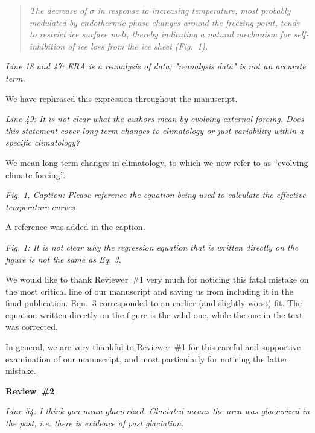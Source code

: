 \documentclass[10pt]{article}
\def\referee#1{\bigskip\textcolor{blue!50!black}{\textit{#1}}}
\def\msquote#1{\begin{quote}\textit{#1}\end{quote}}
\begin{document}
\msquote{The decrease of $\sigma$ in response to increasing temperature, most probably modulated by endothermic phase changes around the freezing point, tends to restrict ice surface melt, thereby indicating a natural mechanism for self-inhibition of ice loss from the ice sheet (Fig.~1).}

\referee{Line 18 and 47: ERA is a reanalysis of data; "reanalysis data" is not an accurate term.}

We have rephrased this expression throughout the manuscript.

\referee{Line 49: It is not clear what the authors mean by evolving external forcing. Does this statement cover long-term changes to climatology or just variability within a specific climatology?}

We mean long-term changes in climatology, to which we now refer to as ``evolving climate forcing''.

\referee{Fig. 1, Caption: Please reference the equation being used to calculate the effective temperature curves}

A reference was added in the caption.

\referee{Fig. 1: It is not clear why the regression equation that is written directly on the figure is not the same as Eq. 3.}

We would like to thank Reviewer~{\#}1 very much for noticing this fatal mistake on the most critical line of our manuscript and saving us from including it in the final publication. Eqn.~3 corresponded to an earlier (and slightly worst) fit. The equation written directly on the figure is the valid one, while the one in the text was corrected.

In general, we are very thankful to Reviewer~{\#}1 for this careful and supportive examination of our manuscript, and most particularly for noticing the latter mistake.


\bigskip
\textbf{Review~{\#}2}



\referee{Line 54: I think you mean glacierized. Glaciated means the area was glacierized in the past, i.e. there is evidence of past glaciation.}
\end{document}
